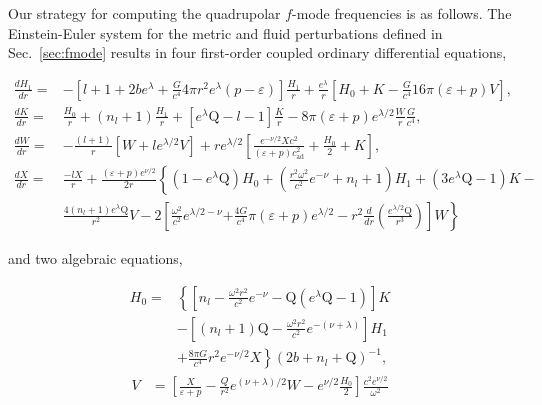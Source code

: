 \documentclass[aps,prd,twocolumn,superscriptaddress,footinbib]{revtex4-1}
\begin{document}
Our strategy for computing the quadrupolar $f$-mode frequencies is as follows. The Einstein-Euler system for the metric and fluid perturbations defined in Sec.~\ref{sec:fmode} results in four first-order coupled ordinary differential equations,

\begin{widetext}
    \begin{align} 
        \frac{d H_{1}}{d r} =& -\left[l+1+2 b e^{\lambda}+ \frac{G}{c^4} 4 \pi r^{2} e^{\lambda}(p-\varepsilon)\right] \frac{H_{1}}{r} +\frac{e^{\lambda}}{r}\left[H_{0}+K-\frac{G}{c^4}16 \pi(\varepsilon+p) V\right] , \label{odei} \\[8pt]
        \frac{d K}{d r} =& \frac{H_{0}}{r}+\left(n_{l}+1\right) \frac{H_{1}}{r} +\left[e^{\lambda} \mathrm{Q}-l-1\right] \frac{K}{r}-8 \pi(\varepsilon+p) e^{\lambda / 2} \frac{W}{r}\frac{G}{c^4} , \\[8pt]
        \frac{d W}{d r} =& -\frac{(l+1)}{r}\left[W+l e^{\lambda/2} V\right] +re^{\lambda / 2}\left[\frac{e^{-\nu / 2} X c^2 }{(\varepsilon+p) c_{\mathrm{ad}}^{2}}+\frac{H_{0}}{2}+K\right] , \\[8pt]
        \frac{d X}{d r} =& \frac{-l X}{r}+\frac{(\varepsilon+p) e^{\nu / 2}}{2r} \left\{\left(1-e^{\lambda} \mathrm{Q}\right) H_{0}+\left(\frac{r^{2} \omega^{2}}{c^2} e^{-\nu}+n_{l}+1\right) H_{1}\right.+\left(3 e^{\lambda} \mathrm{Q}-1\right) K- \nonumber \\[2pt]
        & \frac{4\left(n_{l}+1\right) e^{\lambda} \mathrm{Q}}{r^{2}} V-2\left[\frac{\omega^{2}}{c^2} e^{\lambda / 2-\nu}\left.+\frac{4 G}{c^4} \pi(\varepsilon+p) e^{\lambda / 2}-r^{2} \frac{d}{d r}\left(\frac{e^{\lambda / 2} \mathrm{Q}}{r^{3}}\right)\right] W\right\} \label{odef}
    \end{align}  
\end{widetext}

and two algebraic equations,

\begin{align} 
H_{0}  = & \left\{ \left[n_{l}-\frac{\omega^{2} r^{2}}{c^2} e^{-\nu}-\mathrm{Q}\left(e^{\lambda} \mathrm{Q}-1\right)\right]K\right.  \nonumber \\
& -\left[\left(n_{l}+1\right) \mathrm{Q}-\frac{\omega^{2} r^{2}}{c^2} e^{-(\nu+\lambda)}\right] H_{1} \nonumber \\
&\left.+ \frac{8 \pi G}{c^4} r^{2} e^{-\nu / 2} X   \right\}\left(2 b+n_{l}+\mathrm{Q}\right)^{-1} , \label{ae1} 
\end{align}
\begin{align} 
 V &= \left[\frac{X}{\varepsilon+p}-\frac{Q}{r^{2}} e^{(\nu+\lambda) / 2} W-e^{\nu / 2} \frac{H_{0}}{2}\right] \frac{c^2 e^{\nu / 2}}{\omega^{2}} \label{ae2}
\end{align}
\end{document}
